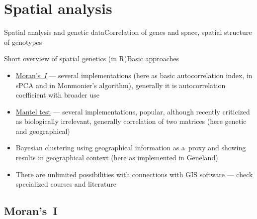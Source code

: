 \documentclass[compress, ucs, xelatex, 11pt, xcolor=svgnames,
	hyperref={
		bookmarks=true,
		unicode=true,
		colorlinks=true,
		pdftitle={Molecular data in R},
		plainpages=false,
		pdfauthor={Vojtech Zeisek},
		pdfsubject={Course about phylogeny and evolution in R},
		pdfcreator={XeLaTeX},
		pdfkeywords={R, evolution, phylogeny, molecular data},
		linkcolor=Tomato,
		anchorcolor=SaddleBrown,
		citecolor=Goldenrod,
		filecolor=DarkMagenta,
		menucolor=Sienna,
		urlcolor=DarkTurquoise,
		pdftex},
	url={hyphens, lowtilde} %
	]{beamer}
\begin{document}
\section{Spatial analysis}

\begin{frame}{Spatial analysis and genetic data}{Correlation of genes and space, spatial structure of genotypes}
	\tableofcontents[currentsection, sectionstyle=show/hide, hideothersubsections]
\end{frame}

\begin{frame}{Short overview of spatial genetics (in R)}{Basic approaches}
	\begin{itemize}
		\item \href{https://en.wikipedia.org/wiki/Moran\%27s_I}{Moran's~\textit{I}} --- several implementations (here as basic autocorrelation index, in sPCA and in Monmonier's algorithm), generally it is autocorrelation coefficient with broader use
		\item \href{https://en.wikipedia.org/wiki/Mantel_test}{Mantel test} --- several implementations, popular, although recently criticized as biologically irrelevant, generally correlation of two matrices (here genetic and geographical)
		\item Bayesian clustering using geographical information as a~proxy and showing results in geographical context (here as implemented in Geneland)
		\item There are unlimited possibilities with connections with GIS software --- check specialized courses and literature
	\end{itemize}
\end{frame}

\subsection{Moran's~I}
\end{document}
